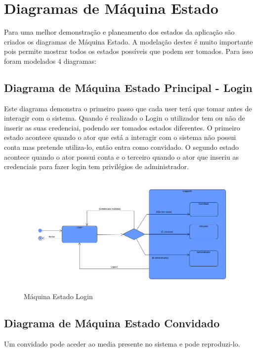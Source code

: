 \documentclass[a4paper]{report}
\begin{document}
\chapter{Diagramas de Máquina Estado}
Para uma melhor demonstração e planeamento dos estados da aplicação são criados os
diagramas de Máquina Estado. A modelação destes é muito importante pois permite
mostrar todos os estados possíveis que podem ser tomados. Para isso foram modelados
4 diagramas:

\section{Diagrama de Máquina Estado Principal - Login}
Este diagrama demonstra o primeiro passo que cada user terá que tomar antes de 
interagir com o sistema. Quando é realizado o Login o utilizador tem ou não de 
inserir as suas credenciai, podendo ser tomados estados
diferentes. O primeiro estado acontece quando o ator que está a interagir
com o sistema não possui conta mas pretende utiliza-lo, então entra como
convidado. O segundo estado acontece quando o ator possui conta e o terceiro
quando o ator que inseriu as credenciais para fazer login tem privilégios de 
administrador.

\begin{figure}[H]
	\centering 
    \includegraphics[width=\textwidth]{images/maqLogin.png}  
    \caption{Máquina Estado Login}
\end{figure}

\section{Diagrama de Máquina Estado Convidado}
Um convidado pode aceder ao media presente no sistema e pode reproduzi-lo.
\end{document}

